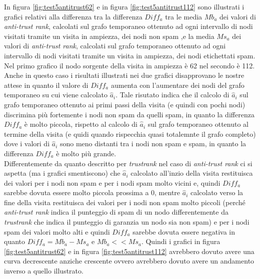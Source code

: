 In figura \ref{fig:test5antitrust62} e in figura \ref{fig:test5antitrust112} sono illustrati i grafici relativi alla differenza tra la differenza \(Diff_a\) tra le media \(Mb_a\) dei valori di \textit{anti-trust rank}, calcolati sul grafo temporaneo ottenuto ad ogni intervallo di nodi visitati tramite un visita in ampiezza, dei nodi non spam ,e la media \(Ms_a\) dei valori di \textit{anti-trust rank}, calcolati sul grafo temporaneo ottenuto ad ogni intervallo di nodi visitati tramite un visita in ampiezza, dei nodi etichettati spam. Nel primo grafico il nodo sorgente della visita in ampiezza è 62 nel secondo è 112. Anche in questo caso i risultati illustrati nei due grafici disapprovano le nostre attese in quanto il valore di \(Diff_a\) aumenta con l'aumentare dei nodi del grafo temporaneo su cui viene calcolato \(\hat{a}_i\). Tale risutato indica che il calcolo di \(\hat{a}_i\) sul grafo temporaneo ottenuto ai primi passi della visita (e quindi con pochi nodi) discrimina più fortemente i nodi non spam da 
quelli spam, in quanto la differenza \(Diff_a\) è molto piccola, rispetto al calcolo di \(\hat{a}_i\) sul grafo temporaneo ottenuto al termine della visita (e quidi quando rispecchia quasi totalemnte il grafo completo) dove i valori di \(\hat{a}_i\) sono meno distanti tra i nodi non spam e spam, in quanto la differenza \(Diff_a\) è molto più grande.\\
Differentemente da quanto descritto per \textit{trustrank} nel caso di \textit{anti-trust rank} ci si aspetta (ma i grafici smentiscono) che \(\hat{a}_i\) calcolato all'inzio della visita restituisca dei valori per i nodi non spam e per i nodi spam molto vicini e, quindi \(Diff_a\) sarebbe dovuta essere molto piccola prossima a 0, mentre  \(\hat{a}_i\) calcolato verso la fine della visita restituisca dei valori per i nodi non spam molto piccoli (perché \textit{anti-trust rank} indica il punteggio di spam di un nodo differentemente da \textit{trustrank} che indica il punteggio di garanzia un nodo sia non spam) e per i nodi spam dei valori molto alti e quindi \(Diff_a\) sarebbe dovuta essere negativa in quanto \( Diff_a=Mb_a-Ms_a\) e \(Mb_a << Ms_a\). Quindi i grafici in figura \ref{fig:test5antitrust62} e in figura \ref{fig:test5antitrust112} avrebbero dovuto avere una curva decrescente anziche crescente ovvero avrebbero dovuto avere un andamento inverso a quello illustrato. 

